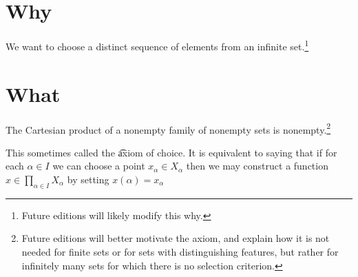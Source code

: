 

\section*{Why}

We want to choose a distinct sequence of elements from an infinite set.\footnote{Future editions will likely modify this why.}

\section*{What}

\begin{principle}[Choice]
The Cartesian product of a nonempty family of nonempty sets is nonempty.\footnote{Future editions will better motivate the axiom, and explain how it is not needed for finite sets or for sets with distinguishing features, but rather for infinitely many sets for which there is no selection criterion.}\end{principle}
This sometimes called the \t{axiom of choice}.
It is equivalent to saying that if for each $\alpha  \in I$ we can choose a point $x_{\alpha } \in X_{\alpha }$ then we may construct a function $x \in \prod_{\alpha  \in I}X_{\alpha }$ by setting $x(\alpha ) = x_{\alpha }$

\blankpage